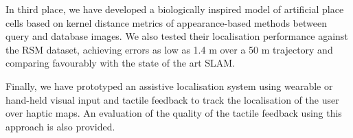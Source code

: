 In third place, we have developed a biologically inspired model of artificial place cells based on kernel distance metrics of appearance-based methods between query and database images. We also tested their localisation performance against the RSM dataset, achieving errors as low as 1.4 m over a 50 m trajectory and comparing favourably with the state of the art SLAM. 

Finally, we have prototyped an assistive localisation system using wearable or hand-held visual input and tactile feedback to track the localisation of the user over haptic maps. An evaluation of the quality of the tactile feedback using this approach is also provided.


\vfill



\endgroup			

\vfill